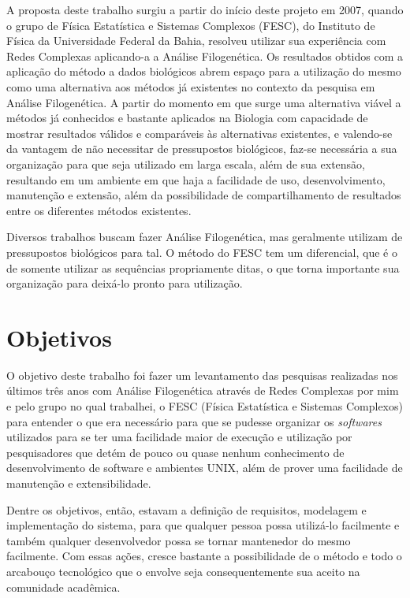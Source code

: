 A proposta deste trabalho surgiu a partir do início deste projeto em 2007, quando o grupo de Física Estatística e Sistemas Complexos (FESC),
do Instituto de Física da Universidade Federal da Bahia, resolveu utilizar sua experiência com Redes Complexas aplicando-a a Análise Filogenética.
Os resultados obtidos com a aplicação do método a dados biológicos abrem espaço para a utilização do mesmo como uma alternativa aos métodos
já existentes no contexto da pesquisa em Análise Filogenética. A partir do momento em que surge uma alternativa viável a métodos já conhecidos
e bastante aplicados na Biologia com capacidade de mostrar resultados válidos e comparáveis às alternativas existentes, e valendo-se da vantagem
de não necessitar de pressupostos biológicos, faz-se necessária a sua organização para que seja utilizado em larga escala, além de sua extensão,
resultando em um ambiente em que haja a facilidade de uso, desenvolvimento, manutenção e extensão, além da possibilidade de compartilhamento de
resultados entre os diferentes métodos existentes.

Diversos trabalhos buscam fazer Análise Filogenética, mas geralmente utilizam de pressupostos biológicos para tal. O método do FESC tem um diferencial,
que é o de somente utilizar as sequências propriamente ditas, o que torna importante sua organização para deixá-lo pronto para utilização.

\section{Objetivos} \label{sec:objetivos}

O objetivo deste trabalho foi fazer um levantamento das pesquisas realizadas nos últimos três anos com Análise Filogenética através de Redes Complexas
por mim e pelo grupo no qual trabalhei, o FESC (Física Estatística e Sistemas Complexos) para entender o que era necessário para que se pudesse organizar
os \textit{softwares} utilizados para se ter uma facilidade maior de execução e utilização por pesquisadores que detém de pouco ou quase nenhum conhecimento
de desenvolvimento de software e ambientes UNIX, além de prover uma facilidade de manutenção e extensibilidade.

Dentre os objetivos, então, estavam a definição de requisitos, modelagem e implementação do sistema, para que qualquer pessoa possa utilizá-lo facilmente e
também qualquer desenvolvedor possa se tornar mantenedor do mesmo facilmente. Com essas ações, cresce bastante a possibilidade de o método e todo o arcabouço
tecnológico que o envolve seja consequentemente sua aceito na comunidade acadêmica.

